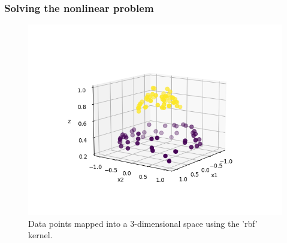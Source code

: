 \documentclass{beamer}
\begin{document}
\begin{frame}{}
	\frametitle{Solving the nonlinear problem}
	\begin{figure}[h]
		\includegraphics[scale=0.5]{img/Circle3D.png}
		\caption{Data points mapped into a 3-dimensional space using the 'rbf' kernel.}
		\label{Fig:rbf3d}
	\end{figure}
\end{frame}
\end{document}
